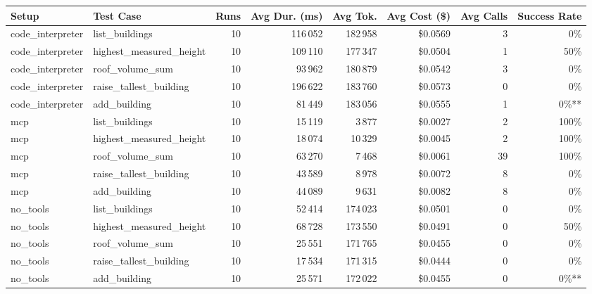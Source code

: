 \begin{table}[H]
\centering
\scriptsize

\begin{tabular}{l l r r r r r r}
\toprule
Setup & Test Case & Runs & Avg Dur. (ms) & Avg Tok. & Avg Cost (\$) & Avg Calls & Success Rate \\
\midrule
code\_interpreter & list\_buildings & 10 & 116\,052 & 182\,958 & \$0.0569 & 3 & 0\% \\
code\_interpreter & highest\_measured\_height & 10 & 109\,110 & 177\,347 & \$0.0504 & 1 & 50\% \\
code\_interpreter & roof\_volume\_sum & 10 & 93\,962 & 180\,879 & \$0.0542 & 3 & 0\% \\
code\_interpreter & raise\_tallest\_building & 10 & 196\,622 & 183\,760 & \$0.0573 & 0 & 0\% \\
code\_interpreter & add\_building & 10 & 81\,449 & 183\,056 & \$0.0555 & 1 & 0\%** \\
\midrule
mcp & list\_buildings & 10 & 15\,119 & 3\,877 & \$0.0027 & 2 & 100\% \\
mcp & highest\_measured\_height & 10 & 18\,074 & 10\,329 & \$0.0045 & 2 & 100\% \\
mcp & roof\_volume\_sum & 10 & 63\,270 & 7\,468 & \$0.0061 & 39 & 100\% \\
mcp & raise\_tallest\_building & 10 & 43\,589 & 8\,978 & \$0.0072 & 8 & 0\% \\
mcp & add\_building & 10 & 44\,089 & 9\,631 & \$0.0082 & 8 & 0\% \\
\midrule
no\_tools & list\_buildings & 10 & 52\,414 & 174\,023 & \$0.0501 & 0 & 0\% \\
no\_tools & highest\_measured\_height & 10 & 68\,728 & 173\,550 & \$0.0491 & 0 & 50\% \\
no\_tools & roof\_volume\_sum & 10 & 25\,551 & 171\,765 & \$0.0455 & 0 & 0\% \\
no\_tools & raise\_tallest\_building & 10 & 17\,534 & 171\,315 & \$0.0444 & 0 & 0\% \\
no\_tools & add\_building & 10 & 25\,571 & 172\,022 & \$0.0455 & 0 & 0\%** \\
\bottomrule
\end{tabular}
\end{table}
